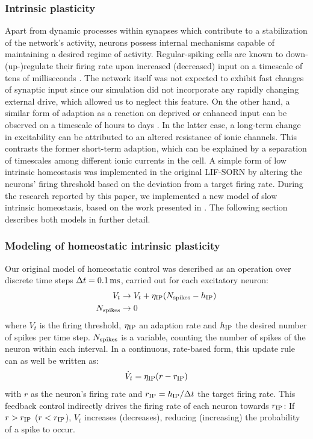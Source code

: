 \documentclass[10pt,letterpaper]{article}
\begin{document}
\subsubsection*{Intrinsic plasticity}
Apart from dynamic processes within synapses which contribute to a stabilization of the network's activity, neurons possess internal mechanisms capable of maintaining a desired regime of activity. Regular-spiking cells are known to down-(up-)regulate their firing rate upon increased (decreased) input on a timescale of tens of milliseconds \cite{Connors_Gutnick_Spike_Patterns,Benda_Herz_Spike_Frequ_Adaption}. The network itself was not expected to exhibit fast changes of synaptic input since our simulation did not incorporate any rapidly changing external drive, which allowed us to neglect this feature. On the other hand, a similar form of adaption as a reaction on deprived or enhanced input can be observed on a timescale of hours to days \cite{Desai_IP}. In the latter case, a long-term change in excitability can be attributed to an altered resistance of ionic channels. This contrasts the former short-term adaption, which can be explained by a separation of timescales among different ionic currents in the cell. A simple form of low intrinsic homeostasis was implemented in the original LIF-SORN by altering the neurons' firing threshold based on the deviation from a target firing rate. During the research reported by this paper, we implemented a new model of slow intrinsic homeostasis, based on the work presented in \cite{Sweeney_Paper}. The following section describes both models in further detail.
\subsubsection*{Modeling of homeostatic intrinsic plasticity}
Our original model of homeostatic control was described as an operation over discrete time steps $\Delta t = \rm 0.1\, ms$, carried out for each excitatory neuron:
\begin{align}
V_t &\rightarrow V_t + \eta_{\rm IP} (N_{\rm spikes} - h_{\rm IP}) \label{can_hom_1}\\
N_{\rm spikes} &\rightarrow 0 \label{can_hom_2}
\end{align}
where $V_t$ is the firing threshold, $\eta_{\rm IP}$ an adaption rate and $h_{\rm IP}$ the desired number of spikes per time step. $N_{\rm spikes}$ is a variable, counting the number of spikes of the neuron within each interval. In a continuous, rate-based form, this update rule can as well be written as:
\begin{equation}
\dot{V}_t = \eta_{\rm IP}(r-r_{\rm IP}) \label{can_hom_rate}
\end{equation}
with $r$ as the neuron's firing rate and $r_{\rm IP}=h_{\rm IP}/\Delta t$ the target firing rate. This feedback control indirectly drives the firing rate of each neuron towards $r_{\rm IP}$: If $r>r_{\rm IP}$ ($r<r_{\rm IP}$), $V_t$ increases (decreases), reducing (increasing) the probability of a spike to occur. 
\end{document}
